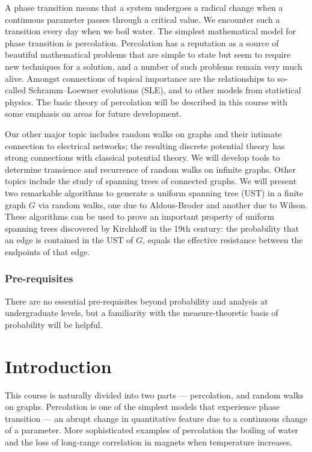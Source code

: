 \documentclass[a4paper]{article}
\begin{document}
\maketitle
{\small
\setlength{\parindent}{0em}
\setlength{\parskip}{1em}

A phase transition means that a system undergoes a radical change when a continuous parameter passes through a critical value. We encounter such a transition every day when we boil water. The simplest mathematical model for phase transition is percolation. Percolation has a reputation as a source of beautiful mathematical problems that are simple to state but seem to require new techniques for a solution, and a number of such problems remain very much alive. Amongst connections of topical importance are the relationships to so-called Schramm--Loewner evolutions (SLE), and to other models from statistical physics. The basic theory of percolation will be described in this course with some emphasis on areas for future development.

Our other major topic includes random walks on graphs and their intimate connection to electrical networks; the resulting discrete potential theory has strong connections with classical potential theory. We will develop tools to determine transience and recurrence of random walks on infinite graphs. Other topics include the study of spanning trees of connected graphs. We will present two remarkable algorithms to generate a uniform spanning tree (UST) in a finite graph $G$ via random walks, one due to Aldous-Broder and another due to Wilson. These algorithms can be used to prove an important property of uniform spanning trees discovered by Kirchhoff in the 19th century: the probability that an edge is contained in the UST of $G$, equals the effective resistance between the endpoints of that edge.

\subsubsection*{Pre-requisites}
There are no essential pre-requisites beyond probability and analysis at undergraduate levels, but a familiarity with the measure-theoretic basis of probability will be helpful.
}
\tableofcontents

\setcounter{section}{-1}
\section{Introduction}
This course is naturally divided into two parts --- percolation, and random walks on graphs. Percolation is one of the simplest models that experience phase transition --- an abrupt change in quantitative feature due to a continuous change of a parameter. More sophisticated examples of percolation the boiling of water and the loss of long-range correlation in magnets when temperature increases.
\end{document}
